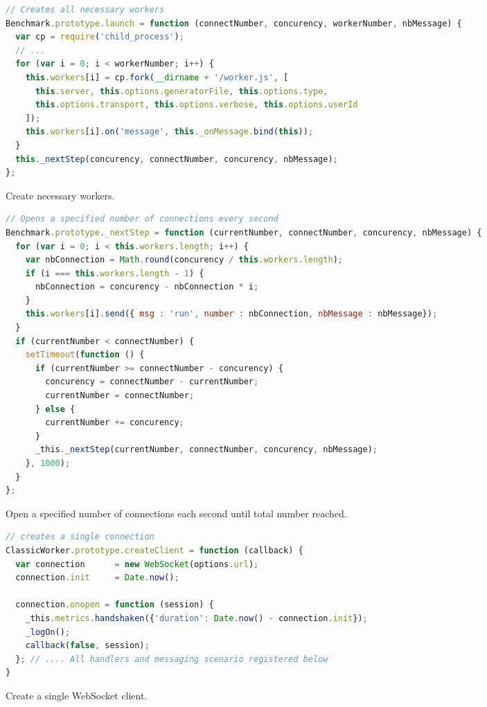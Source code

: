 \documentclass{uvamscse}
\begin{document}
\begin{sourcecode}[H]
\begin{lstlisting}[language=javascript]
// Creates all necessary workers
Benchmark.prototype.launch = function (connectNumber, concurency, workerNumber, nbMessage) {
  var cp = require('child_process');
  // ...
  for (var i = 0; i < workerNumber; i++) {
    this.workers[i] = cp.fork(__dirname + '/worker.js', [
      this.server, this.options.generatorFile, this.options.type,
      this.options.transport, this.options.verbose, this.options.userId
    ]);
    this.workers[i].on('message', this._onMessage.bind(this));
  }
  this._nextStep(concurency, connectNumber, concurency, nbMessage);
};
\end{lstlisting}
\caption{Create necessary workers.}
\label{lstlisting:loadtestexec}
\end{sourcecode}

\begin{sourcecode}[H]
\begin{lstlisting}[language=javascript]
// Opens a specified number of connections every second
Benchmark.prototype._nextStep = function (currentNumber, connectNumber, concurency, nbMessage) {
  for (var i = 0; i < this.workers.length; i++) {
    var nbConnection = Math.round(concurency / this.workers.length);
    if (i === this.workers.length - 1) {
      nbConnection = concurency - nbConnection * i;
    }
    this.workers[i].send({ msg : 'run', number : nbConnection, nbMessage : nbMessage});
  }
  if (currentNumber < connectNumber) {
    setTimeout(function () {
      if (currentNumber >= connectNumber - concurency) {
        concurency = connectNumber - currentNumber;
        currentNumber = connectNumber;
      } else {
        currentNumber += concurency;
      }
      _this._nextStep(currentNumber, connectNumber, concurency, nbMessage);
    }, 1000);
  }
};
\end{lstlisting}
\caption{Open a specified number of connections each second until total number reached.}
\label{lstlisting:loadtestexec2}
\end{sourcecode}

\begin{sourcecode}[H]
\begin{lstlisting}[language=javascript]
// creates a single connection
ClassicWorker.prototype.createClient = function (callback) {
  var connection      = new WebSocket(options.url);
  connection.init     = Date.now();

  connection.onopen = function (session) {
    _this.metrics.handshaken({'duration': Date.now() - connection.init});
    _logOn();
    callback(false, session);
  }; // .... All handlers and messaging scenario registered below
}
\end{lstlisting}
\caption{Create a single WebSocket client.}
\label{lstlisting:loadtestexec3}
\end{sourcecode}
\end{document}
